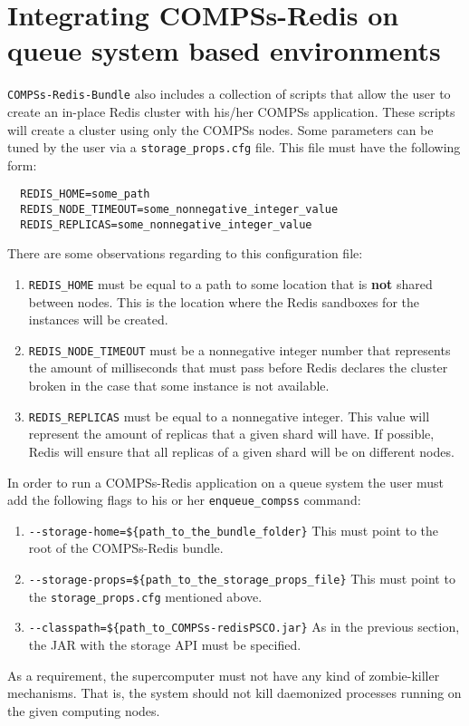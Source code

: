 \documentclass{article}
\begin{document}
  \section{Integrating COMPSs-Redis on queue system based environments}
  \verb|COMPSs-Redis-Bundle| also includes a collection of scripts that allow the user to create an in-place Redis cluster with his/her COMPSs application. These scripts will create a cluster using only the COMPSs nodes. Some parameters can be tuned by the user via a \verb|storage_props.cfg| file. This file must have the following form:
  \begin{verbatim}
  REDIS_HOME=some_path
  REDIS_NODE_TIMEOUT=some_nonnegative_integer_value
  REDIS_REPLICAS=some_nonnegative_integer_value
  \end{verbatim}
  There are some observations regarding to this configuration file:
  \begin{enumerate}
  \item \verb|REDIS_HOME| must be equal to a path to some location that is \textbf{not} shared between nodes. This is the location where the Redis sandboxes for the instances will be created.
  \item \verb|REDIS_NODE_TIMEOUT| must be a nonnegative integer number that represents the amount of milliseconds that must pass before Redis declares the cluster broken in the case that some instance is not available.
  \item \verb|REDIS_REPLICAS| must be equal to a nonnegative integer. This value will represent the amount of replicas that a given shard will have. If possible, Redis will ensure that all replicas of a given shard will be on different nodes. 
  \end{enumerate}
  In order to run a COMPSs-Redis application on a queue system the user must add the following flags to his or her \verb|enqueue_compss| command:
  \begin{enumerate}
  \item \verb|--storage-home=${path_to_the_bundle_folder}| This must point to the root of the COMPSs-Redis bundle.
  \item \verb|--storage-props=${path_to_the_storage_props_file}| This must point to the \verb|storage_props.cfg| mentioned above.
  \item \verb|--classpath=${path_to_COMPSs-redisPSCO.jar}| As in the previous section, the JAR with the storage API must be specified.
  \end{enumerate}
  As a requirement, the supercomputer must not have any kind of zombie-killer mechanisms. That is, the system should not kill daemonized processes running on the given computing nodes.
  
\end{document}
